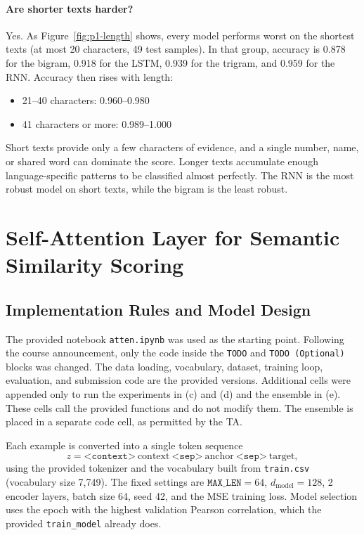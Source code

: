 \documentclass[11pt,a4paper]{article}
\begin{document}
\paragraph{Are shorter texts harder?}
Yes. As Figure~\ref{fig:p1-length} shows, every model performs worst on
the shortest texts (at most 20 characters, 49 test samples). In that
group, accuracy is 0.878 for the bigram, 0.918 for the LSTM, 0.939 for
the trigram, and 0.959 for the RNN. Accuracy then rises with length:
\begin{itemize}
    \item 21--40 characters: 0.960--0.980
    \item 41 characters or more: 0.989--1.000
\end{itemize}
Short texts provide only a few characters of evidence, and a single
number, name, or shared word can dominate the score. Longer texts
accumulate enough language-specific patterns to be classified almost
perfectly. The RNN is the most robust model on short texts, while the
bigram is the least robust.




\section{Self-Attention Layer for Semantic Similarity Scoring}

\subsection{Implementation Rules and Model Design}

The provided notebook \texttt{atten.ipynb} was used as the starting
point. Following the course announcement, only the code inside the
\texttt{TODO} and \texttt{TODO (Optional)} blocks was changed. The data
loading, vocabulary, dataset, training loop, evaluation, and submission
code are the provided versions. Additional cells were appended only to
run the experiments in (c) and (d) and the ensemble in (e). These cells
call the provided functions and do not modify them. The ensemble is
placed in a separate code cell, as permitted by the TA.

Each example is converted into a single token sequence
\[
z=\texttt{<context>}\ \text{context}\ \texttt{<sep>}\ \text{anchor}\ \texttt{<sep>}\ \text{target},
\]
using the provided tokenizer and the vocabulary built from
\texttt{train.csv} (vocabulary size 7,749). The fixed settings are
$\texttt{MAX\_LEN}=64$, $d_{\text{model}}=128$, 2 encoder layers,
batch size 64, seed 42, and the MSE training loss. Model selection uses
the epoch with the highest validation Pearson correlation, which the
provided \texttt{train\_model} already does.
\end{document}
